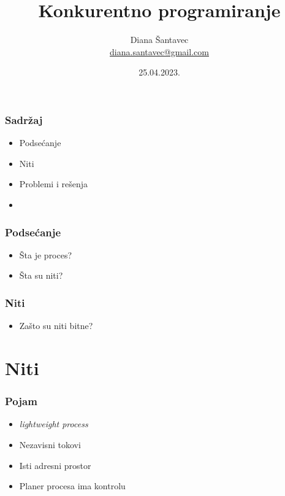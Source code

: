 \documentclass{beamer}
\title{Konkurentno programiranje}
\author[Diana Šantavec]{Diana Šantavec \\ \small \url{diana.santavec@gmail.com}}
\institute{Istraživačka stanica Petnica}
\date{25.04.2023.}
\begin{document}
\frame{\titlepage}

\begin{frame}
    \frametitle{Sadržaj}
    \begin{itemize}
        \item Podsećanje \newline
        \item Niti \newline
        \item Problemi i rešenja \newline
        \item 
    \end{itemize}
\end{frame}

\begin{frame}
    \frametitle{Podsećanje}
    \begin{itemize}
        \item Šta je proces? \newline
        \item Šta su niti? \newline 
    \end{itemize}
\end{frame}

\begin{frame}
    \frametitle{Niti}
    \begin{itemize}
        \item Zašto su niti bitne?
    \end{itemize}
\end{frame}

\section*{Niti}
\begin{frame}
    \frametitle{Pojam}
    \begin{itemize}
        \item \textit{lightweight process} \newline
        \item Nezavisni tokovi \newline
        \item Isti adresni prostor \newline
        \item Planer procesa ima kontrolu
    \end{itemize}

\end{frame}
\end{document}
